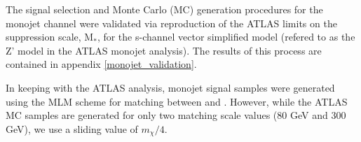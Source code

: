 \begin{flushleft}
The signal selection and Monte Carlo (MC) generation procedures for the monojet channel were validated via reproduction of the ATLAS limits on the suppression scale, M$_{*}$, for the s-channel vector simplified model (refered to as the Z' model in the ATLAS monojet analysis). The results of this process are contained in appendix \ref{monojet_validation}.
\bigskip

In keeping with the ATLAS analysis, monojet signal samples were generated using the MLM scheme for matching between \MG and \PYTHIA. However, while the ATLAS MC samples are generated for only two matching scale values (80 GeV and 300 GeV), we use a sliding value of $m_{\chi}/4$.   

%


\end{flushleft}
